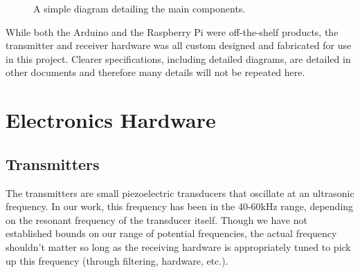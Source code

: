 \documentclass[12pt]{article}
\begin{document}
\begin{figure}[h]
\begin{center}
\end{center}
\caption{A simple diagram detailing the main components.}
\label{fig:component-diagram}
\end{figure}

While both the Arduino and the Raspberry Pi were off-the-shelf products,
the transmitter and receiver hardware was all custom designed and fabricated
for use in this project.
Clearer specifications, including detailed diagrams, are detailed in other
documents and therefore many details will not be repeated here.

\section{Electronics Hardware}\label{sec:ee-hardware}

\subsection{Transmitters}

The transmitters are small piezoelectric transducers that oscillate at an
ultrasonic frequency.
In our work, this frequency has been in the 40-60kHz range, depending on the
resonant frequency of the transducer itself.
Though we have not established bounds on our range of potential frequencies,
the actual frequency shouldn't matter so long as the receiving hardware is
appropriately tuned to pick up this frequency (through filtering, hardware,
etc.).
\end{document}
